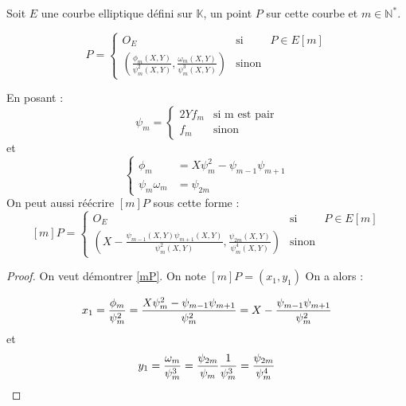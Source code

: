 \documentclass{article}
\begin{document}
\begin{thm}
Soit $E$ une courbe elliptique défini sur $\mathbb{K}$, un point $P$ sur cette courbe et $m \in \mathbb{N}^*$.

\begin{equation}
[m]P = 
\left\lbrace
\begin{array}{ccc}
O_E & \mbox{si} & P \in E[m]  \\
\left(    \frac{\phi_m(X,Y)}{\psi^2_m(X,Y)}, \frac{\omega_m(X,Y)}{\psi^3_m(X,Y)}\right) & \mbox{sinon}  & 
\end{array}\right.
\end{equation}

En posant : 
\begin{equation*}
\psi_m= \left\lbrace
\begin{array}{cc}
2Yf_m & \mbox{si m est pair} \\
f_m & \mbox{sinon}
\end{array}\right.
\end{equation*}
et 
\begin{equation*}
\left\lbrace
\begin{array}{ll}
\phi_m &= X \psi^2_m - \psi_{m-1}\psi_{m+1} \\
\psi_m \omega_m &= \psi_{2m}
\end{array}\right.
\end{equation*}
On peut aussi réécrire $[m]P$ sous cette forme : 
\begin{equation}\label{mP}
[m]P = \left\lbrace
\begin{array}{lll}
O_E & \mbox{si} & P \in E[m]  \\
\left(  X -   \frac{\psi_{m-1}(X,Y)\psi_{m+1}(X,Y)}{\psi^2_m(X,Y)}, \frac{\psi_{2m}(X,Y)}{\psi^4_m(X,Y)}\right) & \mbox{sinon}  & 
\end{array}\right.
\end{equation}
\end{thm}

\begin{proof}
On veut démontrer \ref{mP}. 
\newline
On note $[m]P = (x_1, y_1)$ 
On a alors : 


\begin{equation*}
x_1 = \frac{\phi_m}{\psi^2_m}\\
    =  \frac{X \psi^2_m - \psi_{m-1}\psi_{m+1}}{\psi_m^2} \\
    = X - \frac{\psi_{m-1}\psi_{m+1}}{\psi_m^2}
\end{equation*}
et 
\begin{equation*}
y_1 = \frac{\omega_m}{\psi^3_m} \\
	= \frac{\psi_{2m}}{\psi_m} \frac{1}{\psi_m^3} \\
	= \frac{\psi_{2m}}{\psi_m^4}
\end{equation*}
\end{proof}
\end{document}
